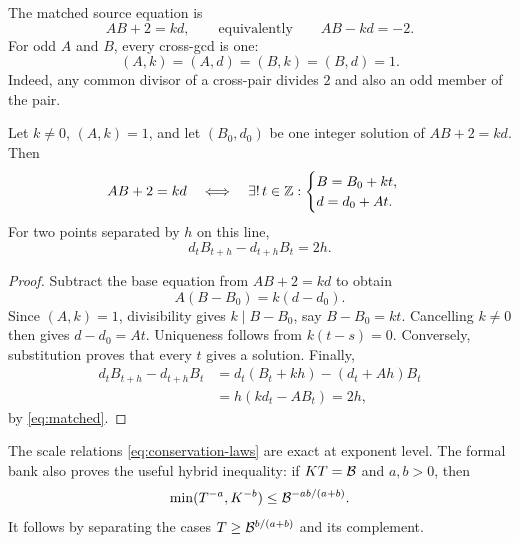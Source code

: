 The matched source equation is
\begin{equation}\label{eq:matched}
                    AB+2=kd,
 \qquad\text{equivalently}\qquad AB-kd=-2.
\end{equation}
For odd $A$ and $B$, every cross-gcd is one:
\begin{equation}\label{eq:four-gcds}
 (A,k)=(A,d)=(B,k)=(B,d)=1.
\end{equation}
Indeed, any common divisor of a cross-pair divides $2$ and also an odd member
of the pair.

\begin{theorem}\label{thm:affine}
Let $k\ne0$, $(A,k)=1$, and let $(B_0,d_0)$ be one integer solution of
$AB+2=kd$.  Then
\begin{equation}\label{eq:affine-biconditional}
 AB+2=kd
 \quad\Longleftrightarrow\quad
 \exists!\,t\in\mathbb Z:
 \begin{cases}
 B=B_0+kt,\\
 d=d_0+At.
 \end{cases}
\end{equation}
For two points separated by $h$ on this line,
\begin{equation}\label{eq:det2h}
             d_tB_{t+h}-d_{t+h}B_t=2h.
\end{equation}
\end{theorem}

\begin{proof}
Subtract the base equation from $AB+2=kd$ to obtain
\[
            A(B-B_0)=k(d-d_0).
\]
Since $(A,k)=1$, divisibility gives $k\mid B-B_0$, say $B-B_0=kt$.
Cancelling $k\ne0$ then gives $d-d_0=At$.  Uniqueness follows from
$k(t-s)=0$.  Conversely, substitution proves that every $t$ gives a solution.
Finally,
\begin{align*}
 d_tB_{t+h}-d_{t+h}B_t
 &=d_t(B_t+kh)-(d_t+Ah)B_t\\
 &=h(kd_t-AB_t)=2h,
\end{align*}
by \cref{eq:matched}.
\end{proof}

The scale relations \cref{eq:conservation-laws} are exact at exponent level.
The formal bank also proves the useful hybrid inequality: if $KT=\mathcal B$ and
$a,b>0$, then
\begin{equation}\label{eq:hybrid-min}
             \min(T^{-a},K^{-b})\le\mathcal B^{-ab/(a+b)}.
\end{equation}
It follows by separating the cases $T\ge\mathcal B^{b/(a+b)}$ and its complement.

